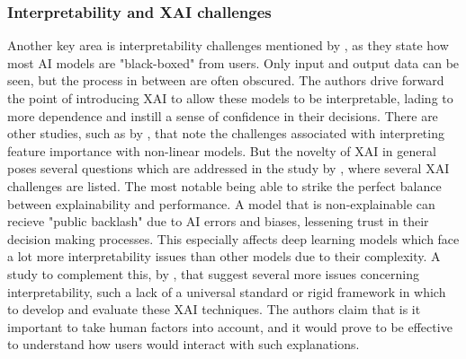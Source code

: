 
\subsubsection*{Interpretability and XAI challenges}
Another key area is interpretability challenges mentioned by \cite{atlam2022business}, as they state how most AI models are "black-boxed" from users. Only input and output data can be seen, but the process in between are often obscured. The authors drive forward the point of introducing XAI to allow these models to be interpretable, lading to more dependence and instill a sense of confidence in their decisions. There are other studies, such as by \cite{al2024novel}, that note the challenges associated with interpreting feature importance with non-linear models. But the novelty of XAI in general poses several questions which are addressed in the study by \cite{yakandawala2023review}, where several XAI challenges are listed. The most notable being able to strike the perfect balance between explainability and performance. A model that is non-explainable can recieve "public backlash" due to AI errors and biases, lessening trust in their decision making processes. This especially affects deep learning models which face a lot more interpretability issues than other models due to their complexity. A study to complement this, by \cite{reddy2023explainable}, that suggest several more issues concerning interpretability, such a lack of a universal standard or rigid framework in which to develop and evaluate these XAI techniques. The authors claim that is it important to take human factors into account, and it would prove to be effective to understand how users would interact with such explanations.
